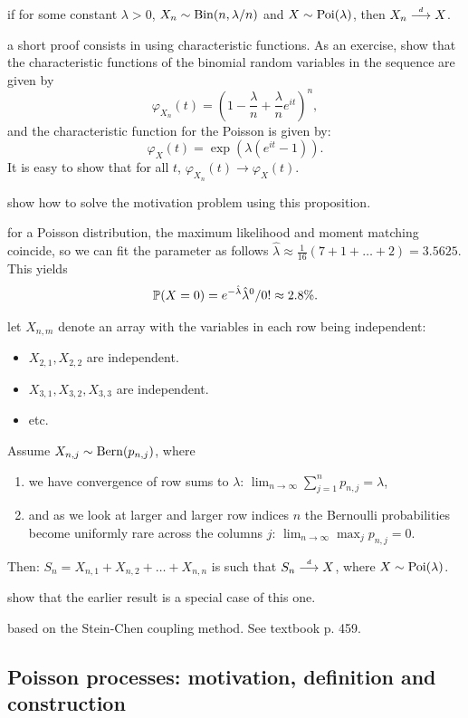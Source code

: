 \documentclass{article}
\begin{document}
 if for some constant $\lambda > 0$,  $X_n \sim \Bin(n, \lambda/n)$ and $X \sim \Poi(\lambda)$, then $X_n \dcv X$.

 a short proof consists in using characteristic functions. As an exercise, show that the characteristic functions of the binomial random variables in the sequence are given by 
\[ \varphi_{X_n}(t) = \left( 1 - \frac{\lambda}{n} + \frac{\lambda}{n} e^{it} \right)^n, \]
and the characteristic function for the Poisson is given by:
\[ \varphi_{X}(t)  = \exp(\lambda(e^{it} - 1)). \]
It is easy to show that for all $t$, $\varphi_{X_n}(t) \to  \varphi_{X}(t)$. 

 show how to solve the motivation problem using this proposition.

 for a Poisson distribution, the maximum likelihood and moment matching coincide, so we can fit the parameter as follows $\hat \lambda \approx \frac{1}{16} (7 + 1 + \dots + 2) = 3.5625$. This yields \[\P(X = 0) = e^{-\hat \lambda} \hat\lambda^0 / 0! \approx 2.8\%. \] 

 let $X_{n,m}$ denote an array with the variables in each row being independent:
\begin{itemize}
  \item $X_{2,1}, X_{2,2}$ are independent.
  \item $X_{3,1}, X_{3,2}, X_{3,3}$ are independent.
  \item etc.
\end{itemize}
Assume $X_{n,j} \sim \Bern(p_{n,j})$, where
\begin{enumerate}
  \item we have convergence of row sums to $\lambda$: $\lim_{n\to\infty} \sum_{j=1}^n p_{n,j} = \lambda$,
  \item and as we look at larger and larger row indices $n$ the Bernoulli probabilities become uniformly rare across the columns $j$: $\lim_{n\to\infty} \max_j p_{n,j} = 0$.
\end{enumerate}
Then: $S_n = X_{n,1} + X_{n,2} + \dots + X_{n,n}$ is such that $S_n \dcv X$, where $X \sim \Poi(\lambda)$.

 show that the earlier result is a special case of this one.

 based on the Stein-Chen coupling method. See textbook p. 459. 


\subsection{Poisson processes: motivation, definition and construction}
\end{document}
